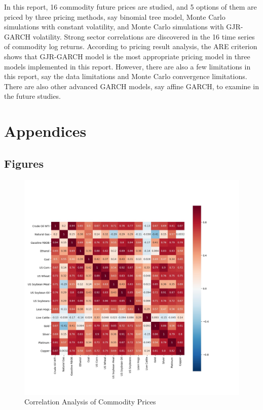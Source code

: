 \documentclass[10pt, a4paper, twocolumn]{article} %
\begin{document}
In this report, 16 commodity future prices are studied, and 5 options of them are priced by three pricing methods, say binomial tree model, Monte Carlo simulations with constant volatility, and Monte Carlo simulations with GJR-GARCH volatility. Strong sector correlations are discovered in the 16 time series of commodity log returns. According to pricing result analysis, the ARE criterion shows that GJR-GARCH model is the most appropriate pricing model in three models implemented in this report. However, there are also a few limitations in this report, say the data limitations and Monte Carlo convergence limitations. There are also other advanced GARCH models, say affine GARCH, to examine in the future studies.

\onecolumn
\printbibliography[title={References}] %

\newpage
\section{Appendices}
\subsection{Figures}
\begin{figure}[!ht]
	\includegraphics[width=\linewidth]{priceCorrelation.jpg} %
	\caption{Correlation Analysis of Commodity Prices} %
	\label{priceCorrelation} %
\end{figure}
\end{document}
